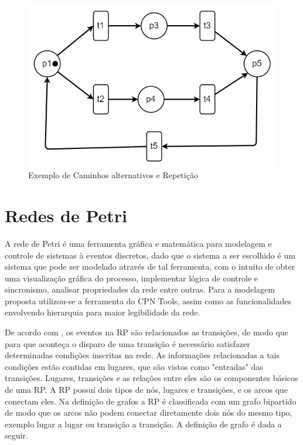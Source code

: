 \begin{figure}[ht]
    \centering
    \includegraphics[scale=0.4]{figures/Petri/caminhos_alternativos.png}
    \caption{Exemplo de Caminhos alternativos e Repetição}
    \label{fig:caminhos_alternativos}
\end{figure}

\section{Redes de Petri}
A rede de Petri é uma ferramenta gráfica e matemática para modelagem e controle de sistemas à eventos discretos, dado que o sistema a ser escolhido é um sistema que pode ser modelado através de tal ferramenta, com o intuito de obter uma visualização gráfica do processo, implementar lógica de controle e sincronismo, analisar propriedades da rede entre outras.
Para a modelagem proposta utilizou-se a ferramenta do CPN Tools, assim como as funcionalidades envolvendo hierarquia para maior legibilidade da rede.

De acordo com \cite{cassandras}, os eventos na RP são relacionados as transições, de modo que para que aconteça o disparo de uma transição é necessário satisfazer determinadas condições inscritas na rede.
As informações relacionadas a tais condições estão contidas em lugares, que são vistos como "entradas" das transições. Lugares, transições e as relações entre eles são os componentes básicos de uma RP. A RP possuí dois tipos de nós, lugares e transições, e os arcos que conectam eles. Na definição de grafos a RP é classificada com um grafo bipartido de modo que os arcos não podem conectar diretamente dois nós do mesmo tipo, exemplo lugar a lugar ou transição a transição.
A definição de grafo é dada a seguir.


